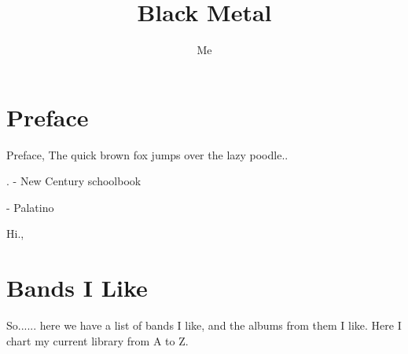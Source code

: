 \documentclass[onecolumn]{article}
\begin{document}
\title{Black Metal}

\predate{}
\postdate{}
\date{}

\author{Me}
\maketitle
\thispagestyle{empty} %
\clearpage{} %

\thispagestyle{empty} %
\renewcommand{\contentsname}{\centering Contents} %
\tableofcontents
\newpage



\section*{\centering
Preface} %

Preface, The quick brown fox jumps over the lazy poodle..


{\selectfont %
\lipsum[1]. - New Century schoolbook}

{\selectfont  %
\lipsum[1] - Palatino}

\selectfont %
Hi.,

\clearpage{}
\section*{\centering Bands I Like}
So...... here we have a list of bands I like, and the albums from them I like. Here I chart my current library from A to Z.
 
\end{document}
